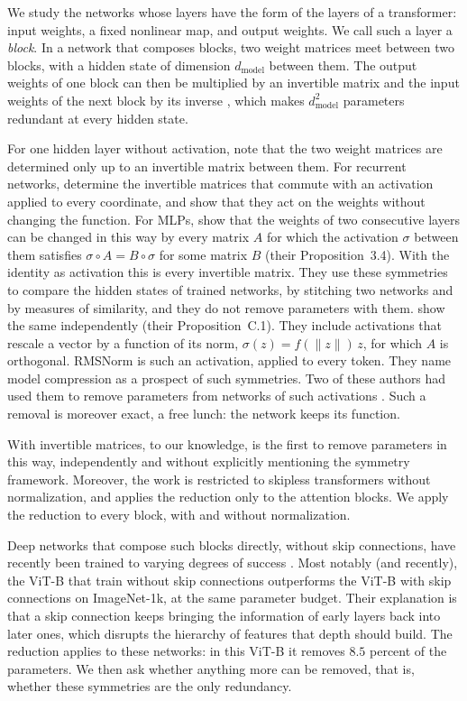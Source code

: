 \documentclass[10pt]{article}
\theoremstyle{definition}
\theoremstyle{remark}
\newcommand{\dm}{d_{\mathrm{model}}}
\newcommand{\norm}[1]{\lVert #1\rVert}
\begin{document}
We study the networks whose layers have the form of the layers of a transformer: input weights, a fixed nonlinear map, and output weights. We call such a layer a \emph{block}. In a network that composes blocks, two weight matrices meet between two blocks, with a hidden state of dimension $\dm$ between them. The output weights of one block can then be multiplied by an invertible matrix and the input weights of the next block by its inverse \citep{godfrey2022symmetries,zhao2023symmetries}, which makes $\dm^2$ parameters redundant at every hidden state.

For one hidden layer without activation, \citet{albertini1993uniqueness} note that the two weight matrices are determined only up to an invertible matrix between them. For recurrent networks, \citet[Section~4]{albertini1993form} determine the invertible matrices that commute with an activation applied to every coordinate, and show that they act on the weights without changing the function. For MLPs, \citet{godfrey2022symmetries} show that the weights of two consecutive layers can be changed in this way by every matrix $A$ for which the activation $\sigma$ between them satisfies $\sigma \circ A = B \circ \sigma$ for some matrix $B$ (their Proposition~3.4). With the identity as activation this is every invertible matrix. They use these symmetries to compare the hidden states of trained networks, by stitching two networks and by measures of similarity, and they do not remove parameters with them. \citet{zhao2023symmetries} show the same independently (their Proposition~C.1). They include activations that rescale a vector by a function of its norm, $\sigma(z) = f(\norm{z})\,z$, for which $A$ is orthogonal. RMSNorm is such an activation, applied to every token. They name model compression as a prospect of such symmetries. Two of these authors had used them to remove parameters from networks of such activations \citep{ganev2021universal,ganev2022quiver}. Such a removal is moreover exact, a free lunch: the network keeps its function.

With invertible matrices, to our knowledge, \citet{graef2024tricks} is the first to remove parameters in this way, independently and without explicitly mentioning the symmetry framework. Moreover, the work is restricted to skipless transformers without normalization, and applies the reduction only to the attention blocks. We apply the reduction to every block, with and without normalization.

Deep networks that compose such blocks directly, without skip connections, have recently been trained to varying degrees of success \citep{he2023shortcuts,he2024simplifying,ji2025always}. Most notably (and recently), the ViT-B that \citet{ji2026cutting} train without skip connections outperforms the ViT-B with skip connections on ImageNet-1k, at the same parameter budget. Their explanation is that a skip connection keeps bringing the information of early layers back into later ones, which disrupts the hierarchy of features that depth should build. The reduction applies to these networks: in this ViT-B it removes $8.5$ percent of the parameters. We then ask whether anything more can be removed, that is, whether these symmetries are the only redundancy.
\end{document}
